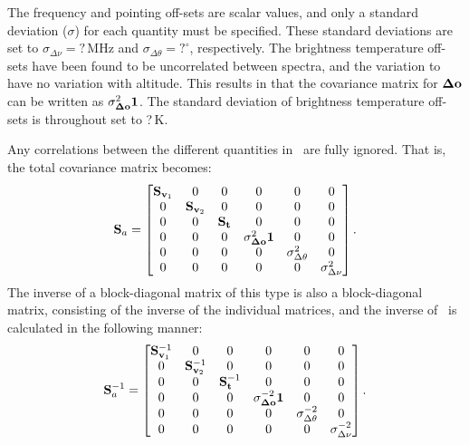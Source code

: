 The frequency and pointing off-sets are scalar values, and only a standard
deviation ($\sigma$) for each quantity must be specified. These standard deviations
are set to $\sigma_{\Delta\nu}=?$\,MHz and $\sigma_{\Delta\theta}=?^\circ$, respectively.
The brightness temperature off-sets have been found to be uncorrelated between
spectra, and the variation to have no variation with altitude. This results in
that the covariance matrix for $\mathbf{\Delta\mathbf{o}}$ can be written as 
$\sigma_{\mathbf{\Delta\mathbf{o}}}^2\mathbf{1}$. The standard deviation of
brightness temperature off-sets is throughout set to ?\,K.

Any correlations between the different quantities in \SttVct\ are fully
ignored. That is, the total covariance matrix becomes:
\begin{equation}
  \label{eq:sa}
  \mathbf{S}_{a} =
  \begin{bmatrix}
    \mathbf{S}_{\mathbf{v}_1} & 0 & 0 & 0 & 0 & 0 \\
    0 & \mathbf{S}_{\mathbf{v}_2} & 0 & 0 & 0 & 0 \\
    0 & 0 & \mathbf{S}_{\mathbf{t}} & 0 & 0 & 0 \\
    0 & 0 & 0 & \sigma_{\mathbf{\Delta\mathbf{o}}}^2\mathbf{1} & 0 & 0 \\
    0 & 0 & 0 & 0 & \sigma_{\Delta\theta}^2 & 0 \\
    0 & 0 & 0 & 0 & 0 & \sigma_{\Delta\nu}^2 \\
  \end{bmatrix}.
\end{equation}
The inverse of a block-diagonal matrix of this type is also a block-diagonal
matrix, consisting of the inverse of the individual matrices, and the inverse
of \ is calculated in the following manner:
\begin{equation}
  \label{eq:sainv}
  \mathbf{S}_{a}^{-1} =
  \begin{bmatrix}
    \mathbf{S}_{\mathbf{v}_1}^{-1} & 0 & 0 & 0 & 0 & 0 \\
    0 & \mathbf{S}_{\mathbf{v}_2}^{-1} & 0 & 0 & 0 & 0 \\
    0 & 0 & \mathbf{S}_{\mathbf{t}}^{-1} & 0 & 0 & 0 \\
    0 & 0 & 0 & \sigma_{\mathbf{\Delta\mathbf{o}}}^{-2}\mathbf{1} & 0 & 0 \\
    0 & 0 & 0 & 0 & \sigma_{\Delta\theta}^{-2} & 0 \\
    0 & 0 & 0 & 0 & 0 & \sigma_{\Delta\nu}^{-2} \\
  \end{bmatrix}.
\end{equation}



